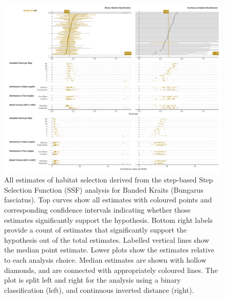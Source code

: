 \documentclass[10pt,a4paper]{article}
\begin{document}
\begin{figure}
\includegraphics[width=1\linewidth]{../../figures/specCurve_Banded Krait_ssf} \caption{All estimates of habitat selection derived from the step-based Step Selection Function (SSF) analysis for Banded Kraits (Bungarus fasciatus). Top curves show all estimates with coloured points and corresponding confidence intervals indicating whether those estimates significantly support the hypothesis. Bottom right labels provide a count of estimates that significantly support the hypothesis out of the total estimates. Labelled vertical lines show the median point estimate. Lower plots show the estimates relative to each analysis choice. Median estimates are shown with hollow diamonds, and are connected with appropriately coloured lines. The plot is split left and right for the analysis using a binary classification (left), and continuous inverted distance (right).}\label{fig:specCurveSsfBUFA}
\end{figure}
\end{document}
